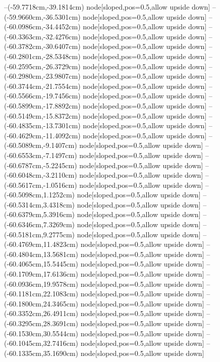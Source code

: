 --(-59.7718cm,-39.1814cm) node[sloped,pos=0.5,allow upside down]{\ArrowIn}
--(-59.9660cm,-36.5301cm) node[sloped,pos=0.5,allow upside down]{\ArrowIn}
--(-60.0986cm,-34.4452cm) node[sloped,pos=0.5,allow upside down]{\ArrowIn}
--(-60.3363cm,-32.4276cm) node[sloped,pos=0.5,allow upside down]{\ArrowIn}
--(-60.3782cm,-30.6407cm) node[sloped,pos=0.5,allow upside down]{\ArrowIn}
--(-60.2801cm,-28.5348cm) node[sloped,pos=0.5,allow upside down]{\ArrowIn}
--(-60.2595cm,-26.3729cm) node[sloped,pos=0.5,allow upside down]{\ArrowIn}
--(-60.2980cm,-23.9807cm) node[sloped,pos=0.5,allow upside down]{\ArrowIn}
--(-60.3744cm,-21.7554cm) node[sloped,pos=0.5,allow upside down]{\ArrowIn}
--(-60.5566cm,-19.7456cm) node[sloped,pos=0.5,allow upside down]{\ArrowIn}
--(-60.5899cm,-17.8892cm) node[sloped,pos=0.5,allow upside down]{\ArrowIn}
--(-60.5149cm,-15.8372cm) node[sloped,pos=0.5,allow upside down]{\ArrowIn}
--(-60.4835cm,-13.7301cm) node[sloped,pos=0.5,allow upside down]{\ArrowIn}
--(-60.4629cm,-11.4092cm) node[sloped,pos=0.5,allow upside down]{\ArrowIn}
--(-60.5089cm,-9.1407cm) node[sloped,pos=0.5,allow upside down]{\ArrowIn}
--(-60.6553cm,-7.1497cm) node[sloped,pos=0.5,allow upside down]{\ArrowIn}
--(-60.6787cm,-5.2245cm) node[sloped,pos=0.5,allow upside down]{\ArrowIn}
--(-60.6048cm,-3.2110cm) node[sloped,pos=0.5,allow upside down]{\ArrowIn}
--(-60.5617cm,-1.0516cm) node[sloped,pos=0.5,allow upside down]{\ArrowIn}
--(-60.5098cm,1.1252cm) node[sloped,pos=0.5,allow upside down]{\ArrowIn}
--(-60.5314cm,3.4318cm) node[sloped,pos=0.5,allow upside down]{\ArrowIn}
--(-60.6379cm,5.3916cm) node[sloped,pos=0.5,allow upside down]{\ArrowIn}
--(-60.6346cm,7.3269cm) node[sloped,pos=0.5,allow upside down]{\ArrowIn}
--(-60.5181cm,9.2775cm) node[sloped,pos=0.5,allow upside down]{\ArrowIn}
--(-60.4769cm,11.4823cm) node[sloped,pos=0.5,allow upside down]{\ArrowIn}
--(-60.4804cm,13.5681cm) node[sloped,pos=0.5,allow upside down]{\ArrowIn}
--(-60.4065cm,15.5445cm) node[sloped,pos=0.5,allow upside down]{\ArrowIn}
--(-60.1709cm,17.6136cm) node[sloped,pos=0.5,allow upside down]{\ArrowIn}
--(-60.0936cm,19.9578cm) node[sloped,pos=0.5,allow upside down]{\ArrowIn}
--(-60.1181cm,22.1083cm) node[sloped,pos=0.5,allow upside down]{\ArrowIn}
--(-60.1800cm,24.3465cm) node[sloped,pos=0.5,allow upside down]{\ArrowIn}
--(-60.3352cm,26.4911cm) node[sloped,pos=0.5,allow upside down]{\ArrowIn}
--(-60.3295cm,28.3691cm) node[sloped,pos=0.5,allow upside down]{\ArrowIn}
--(-60.1530cm,30.5544cm) node[sloped,pos=0.5,allow upside down]{\ArrowIn}
--(-60.1045cm,32.7416cm) node[sloped,pos=0.5,allow upside down]{\ArrowIn}
--(-60.1335cm,35.1690cm) node[sloped,pos=0.5,allow upside down]{\ArrowIn}
